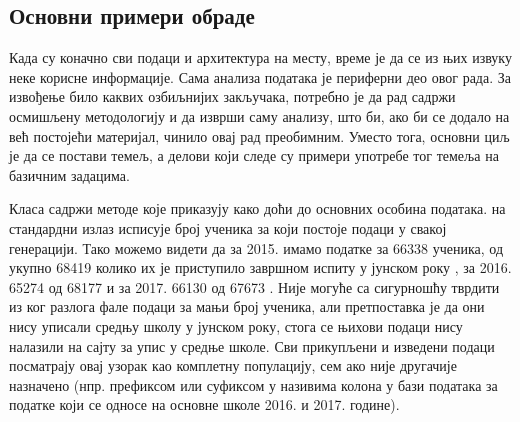 \subsection{Основни примери обраде}\label{subs:osn_obrada}

Када су коначно сви подаци и архитектура на месту, време је да се из њих извуку неке корисне информације. Сама анализа података је периферни део овог рада. За извођење било каквих озбиљнијих закључака, потребно је да рад садржи осмишљену методологију и да изврши саму анализу, што би, ако би се додало на већ постојећи материјал, чинило овај рад преобимним. Уместо тога, основни циљ је да се постави темељ, а делови који следе су примери употребе тог темеља на базичним задацима.

Класа  садржи методе које приказују како доћи до основних особина података.  на стандардни излаз исписује број ученика за који постоје подаци у свакој генерацији. Тако можемо видети да за 2015. имамо податке за 66338 ученика, од укупно 68419 колико их је приступило завршном испиту у јунском року \citep{izvestaj15}, за 2016. 65274 од 68177 \citep{izvestaj16manjine} и за 2017. 66130 од 67673 \citep{izvestaj17manjine}. Није могуће са сигурношћу тврдити из ког разлога фале подаци за мањи број ученика, али претпоставка је да они нису уписали средњу школу у јунском року, стога се њихови подаци нису налазили на сајту за упис у средње школе. Сви прикупљени и изведени подаци посматрају овај узорак као комплетну популацију, сем ако није другачије назначено (нпр. префиксом  или суфиксом  у називима колона у бази података за податке који се односе на основне школе 2016. и 2017. године).

